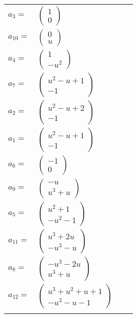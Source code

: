 \documentclass[1p]{elsarticle_modified}
\theoremstyle{definition}
\begin{document}
\begin{tabular}{m{7pt} m{180pt} m{7pt} m{180pt} }
\flushright $a_{3}=$&$\begin{pmatrix}1\\0\end{pmatrix}$ \\
\flushright $a_{10}=$&$\begin{pmatrix}0\\u\end{pmatrix}$ \\
\flushright $a_{4}=$&$\begin{pmatrix}1\\- u^2\end{pmatrix}$ \\
\flushright $a_{7}=$&$\begin{pmatrix}u^2- u+1\\-1\end{pmatrix}$ \\
\flushright $a_{2}=$&$\begin{pmatrix}u^2- u+2\\-1\end{pmatrix}$ \\
\flushright $a_{1}=$&$\begin{pmatrix}u^2- u+1\\-1\end{pmatrix}$ \\
\flushright $a_{6}=$&$\begin{pmatrix}-1\\0\end{pmatrix}$ \\
\flushright $a_{9}=$&$\begin{pmatrix}- u\\u^3+u\end{pmatrix}$ \\
\flushright $a_{5}=$&$\begin{pmatrix}u^2+1\\- u^2-1\end{pmatrix}$ \\
\flushright $a_{11}=$&$\begin{pmatrix}u^3+2 u\\- u^3- u\end{pmatrix}$ \\
\flushright $a_{8}=$&$\begin{pmatrix}- u^3-2 u\\u^3+u\end{pmatrix}$ \\
\flushright $a_{12}=$&$\begin{pmatrix}u^3+u^2+u+1\\- u^3- u-1\end{pmatrix}$\\&\end{tabular}
\end{document}
